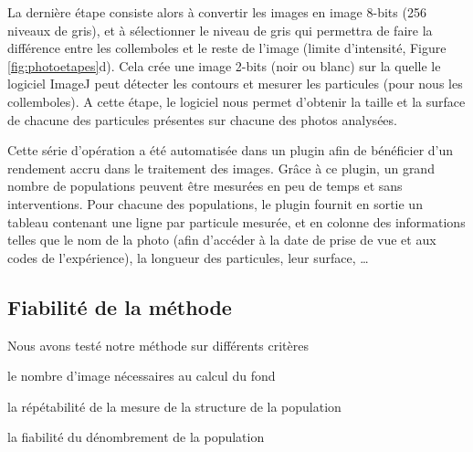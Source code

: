 La dernière étape consiste alors à convertir les images en image 8-bits (256
niveaux de gris), et à sélectionner le niveau de gris qui permettra de faire la
différence entre les collemboles et le reste de l'image (limite d'intensité,
Figure \ref{fig:photoetapes}d). Cela crée une image 2-bits (noir ou blanc) sur
la quelle le logiciel ImageJ peut détecter les contours et mesurer les
particules (pour nous les collemboles). A cette étape, le logiciel nous permet
d'obtenir la taille et la surface de chacune des particules présentes sur
chacune des photos analysées.

Cette série d'opération a été automatisée dans un plugin afin de bénéficier d'un
rendement accru dans le traitement des images. Grâce à ce plugin, un grand
nombre de populations peuvent être mesurées en peu de temps et sans
interventions. Pour chacune des populations, le plugin fournit en sortie un
tableau contenant une ligne par particule mesurée, et en colonne des
informations telles que le nom de la photo (afin d'accéder à la date de prise
de vue et aux codes de l'expérience), la longueur des particules, leur
surface, \ldots

\subsection{Fiabilité de la méthode}

Nous avons testé notre méthode sur différents critères \begin{enumerate*}[label=(\roman*), before=\unskip{ : }, itemjoin={{ ; }},
itemjoin*={{ ; et }}] 
\item le nombre d'image nécessaires au calcul du fond
\item la répétabilité de la mesure de la structure de la population
\item la fiabilité du dénombrement de la population
\end{enumerate*}

